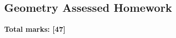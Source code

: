 \documentclass[../c1]{subfiles}
\begin{document}
\subsection*{Geometry Assessed Homework}
\thispagestyle{fancy}



\begin{flushright}
\textbf{Total marks: [47]}
\end{flushright}
\end{document}

